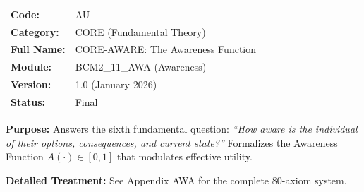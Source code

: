 %
%
%
%

\begin{tcolorbox}[colback=gray!5!white, colframe=gray!75!black,
    title=Appendix Header: AU CORE-AWARE]

\begin{tabular}{@{}ll@{}}
\textbf{Code:} & AU \\
\textbf{Category:} & CORE (Fundamental Theory) \\
\textbf{Full Name:} & CORE-AWARE: The Awareness Function \\
\textbf{Module:} & BCM2\_11\_AWA (Awareness) \\
\textbf{Version:} & 1.0 (January 2026) \\
\textbf{Status:} & Final \\
\end{tabular}

\vspace{0.5em}
\textbf{Purpose:} Answers the sixth fundamental question:
\textit{``How aware is the individual of their options, consequences, and current state?''}
Formalizes the Awareness Function $A(\cdot) \in [0, 1]$ that modulates effective utility.

\textbf{Detailed Treatment:} See Appendix AWA for the complete 80-axiom system.

\end{tcolorbox}

